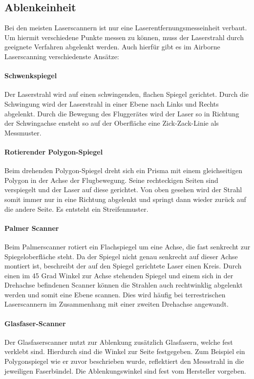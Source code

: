 \documentclass[a4paper,12pt,bibliography=totoc, listof=totoc,titlepage,pointlessnumbers]{scrreprt}
\begin{document}
\subsection{Ablenkeinheit}
Bei den meisten Laserscannern ist nur eine Laserentfernungsmesseinheit verbaut. Um hiermit verschiedene Punkte messen zu können, muss der Laserstrahl durch geeignete Verfahren abgelenkt werden. Auch hierfür gibt es im Airborne Laserscanning verschiedenste Ansätze:

\paragraph{Schwenkspiegel}
Der Laserstrahl wird auf einen schwingenden, flachen Spiegel gerichtet. Durch die Schwingung wird der Laserstrahl in einer Ebene nach Links und Rechts abgelenkt. Durch die Bewegung des Fluggerätes wird der Laser so in Richtung der Schwingachse ensteht so auf der Oberfläche eine Zick-Zack-Linie als Messmuster.

\paragraph{Rotierender Polygon-Spiegel}
Beim drehenden Polygon-Spiegel dreht sich ein Prisma mit einem gleichseitigen Polygon in der Achse der Flugbewegung. Seine rechteckigen Seiten sind verspiegelt und der Laser auf diese gerichtet. Von oben gesehen wird der Strahl somit immer nur in eine Richtung abgelenkt und springt dann wieder zurück auf die andere Seite. Es entsteht ein Streifenmuster.

\paragraph{Palmer Scanner}
Beim Palmerscanner rotiert ein Flachspiegel um eine Achse, die fast senkrecht zur Spiegeloberfläche steht. Da der Spiegel nicht genau senkrecht auf dieser Achse montiert ist, beschreibt der auf den Spiegel gerichtete Laser einen Kreis. Durch einen im 45 Grad Winkel zur Achse stehenden Spiegel und einem sich in der Drehachse befindenen Scanner können die Strahlen auch rechtwinklig abgelenkt werden und somit eine Ebene scannen. Dies wird häufig bei terrestrischen Laserscannern im Zusammenhang mit einer zweiten Drehachse angewandt.

\paragraph{Glasfaser-Scanner}
\label{p:faserscanner}
Der Glasfaserscanner nutzt zur Ablenkung zusätzlich Glasfasern, welche fest verklebt sind. Hierdurch sind die Winkel zur Seite festgegeben. Zum Beispiel ein Polygonspiegel wie er zuvor beschrieben wurde, reflektiert den Messstrahl in die jeweiligen Faserbündel. Die Ablenkungswinkel sind fest vom Hersteller vorgeben.
\end{document}
